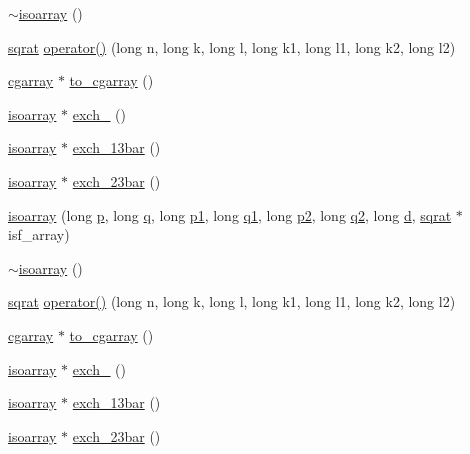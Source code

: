 \begin{DoxyCompactItemize}
\item 
\mbox{\hyperlink{classisoarray_ab1ff7ca3e0edb468608b42d2d2aad08b}{$\sim$isoarray}} ()
\item 
\mbox{\hyperlink{classsqrat}{sqrat}} \mbox{\hyperlink{classisoarray_a07114d3b1b8f125d169f10f81884ce16}{operator()}} (long n, long k, long l, long k1, long l1, long k2, long l2)
\item 
\mbox{\hyperlink{classcgarray}{cgarray}} $\ast$ \mbox{\hyperlink{classisoarray_a66ca849c4b34cafeee945037d814a8dc}{to\+\_\+cgarray}} ()
\item 
\mbox{\hyperlink{classisoarray}{isoarray}} $\ast$ \mbox{\hyperlink{classisoarray_ac56742183c8846ff2a5b315d1fc0b90b}{exch\+\_}} ()
\item 
\mbox{\hyperlink{classisoarray}{isoarray}} $\ast$ \mbox{\hyperlink{classisoarray_a0fd60ac09d139d86f9cf8fa18fa5577d}{exch\+\_\+13bar}} ()
\item 
\mbox{\hyperlink{classisoarray}{isoarray}} $\ast$ \mbox{\hyperlink{classisoarray_a9dd30b80f22c1bbc17633283f0056e69}{exch\+\_\+23bar}} ()
\item 
\mbox{\hyperlink{classisoarray_a2255ec3a14431cdc95ea8d0b0150fde6}{isoarray}} (long \mbox{\hyperlink{classisoarray_adeea7560653c9c61f9ec7ca78ec1a43d}{p}}, long \mbox{\hyperlink{classisoarray_a6ba8b815c26280122084ee9754cfd868}{q}}, long \mbox{\hyperlink{classisoarray_a44a74d2c637cd50b4016fb68f469d674}{p1}}, long \mbox{\hyperlink{classisoarray_a49a8c7ad042720ba0f0251f838a81926}{q1}}, long \mbox{\hyperlink{classisoarray_a2c7e4538fd56007f89979d0f1d19f4cf}{p2}}, long \mbox{\hyperlink{classisoarray_a3d08dedb3a7b238fe7a088f8aa54db0b}{q2}}, long \mbox{\hyperlink{classisoarray_af3715f50052bd54b3476e9831fe4d71b}{d}}, \mbox{\hyperlink{classsqrat}{sqrat}} $\ast$isf\+\_\+array)
\item 
\mbox{\hyperlink{classisoarray_ab1ff7ca3e0edb468608b42d2d2aad08b}{$\sim$isoarray}} ()
\item 
\mbox{\hyperlink{classsqrat}{sqrat}} \mbox{\hyperlink{classisoarray_a07114d3b1b8f125d169f10f81884ce16}{operator()}} (long n, long k, long l, long k1, long l1, long k2, long l2)
\item 
\mbox{\hyperlink{classcgarray}{cgarray}} $\ast$ \mbox{\hyperlink{classisoarray_a66ca849c4b34cafeee945037d814a8dc}{to\+\_\+cgarray}} ()
\item 
\mbox{\hyperlink{classisoarray}{isoarray}} $\ast$ \mbox{\hyperlink{classisoarray_ac56742183c8846ff2a5b315d1fc0b90b}{exch\+\_}} ()
\item 
\mbox{\hyperlink{classisoarray}{isoarray}} $\ast$ \mbox{\hyperlink{classisoarray_a0fd60ac09d139d86f9cf8fa18fa5577d}{exch\+\_\+13bar}} ()
\item 
\mbox{\hyperlink{classisoarray}{isoarray}} $\ast$ \mbox{\hyperlink{classisoarray_a9dd30b80f22c1bbc17633283f0056e69}{exch\+\_\+23bar}} ()
\end{DoxyCompactItemize}
